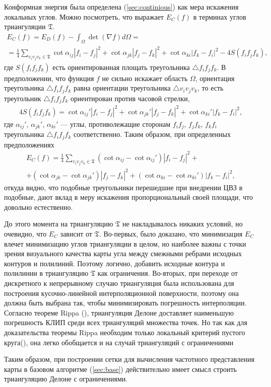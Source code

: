 Конформная энергия была определена (\ref{sec:continious}) как мера искажения локальных углов.
Можно посмотреть, что выражает $E_C(f)$ в терминах углов триангуляции $\mathfrak{T}$. 
\begin{multline*}
  E_C(f) = E_D(f) - \int_{\Omega} \det (\nabla f) d\Omega = \\ 
  = \frac{1}{4} \sum_{v_i v_j v_k \in \mathfrak{T}} \cot{\alpha_{ij}}|f_i - f_j|^2 + 
  \cot{\alpha_{jk}}|f_j - f_k|^2 + \cot{\alpha_{ki}}|f_k - f_i|^2 - 4S(f_i f_j f_k),
\end{multline*}
где $S(f_i f_j f_k)$ есть ориентированная площать треугольника $\triangle f_i f_j f_k$. 
В предположении, что функция $f$ не сильно искажает область $\Omega$, 
ориентация треугольника $\triangle f_i f_j f_k$ равна ориентации треугольника 
$\triangle v_i v_j v_k$, то есть треугольник $\triangle f_i f_j f_k$ ориентирован против часовой
стрелки,
\begin{multline*}
  4 S(f_i f_j f_k) = \cot{\alpha_{ij}'}|f_i - f_j|^2 + \cot{\alpha_{jk}'}|f_j - f_k|^2 + \cot{\alpha_{ki}'}|f_k - f_i|^2,
\end{multline*}
где $\alpha_{ij}'$, $\alpha_{jk}'$, $\alpha_{ki}'$ --- углы, противолежащие сторонам $f_i f_j$, 
$f_j f_k$, $f_k f_i$ треугольника $\triangle f_i f_j f_k$ соответственно. 
Таким образом, при определенных предположениях
\begin{multline*}
  E_C(f) = \frac{1}{4} \sum_{v_i v_j v_k \in \mathfrak{T}} (\cot{\alpha_{ij}} - \cot{\alpha_{ij}'})|f_i - f_j|^2 + \\
  + (\cot{\alpha_{jk}} - \cot{\alpha_{jk}'})|f_j - f_k|^2 + (\cot{\alpha_{ki}} - \cot{\alpha_{ki}'})|f_k - f_i|^2,
\end{multline*} откуда видно, что подобные треугольники перешедшие при внедрении ЦВЗ в подобные,
дают вклад в меру искажения пропорциональный своей площади, что довольно естественно.

До этого момента на триангуляцию $\mathfrak{T}$ не накладывалось никаких условий, но очевидно, что
$E_C$ зависит от $\mathfrak{T}$. Во-первых, было доказано, что минимизация $E_C$ влечет 
минимизацию углов триангуляции в целом, но наиболее важны с точки зрения визуального качества
карты угла между смежными ребрами исходных контуров и полилиний. Поэтому логично, 
добавить исходные контура и полилинии в триангуляцию $\mathfrak{T}$ как ограничения.
Во-вторых, при переходе от дискретного к непрерывному случаю триангуляция была использована для
построения кусочно-линейной интерполяционной поверхности, поэтому она должна быть выбрана так,
чтобы минимизировать погрешность интерполяции. Согласно теореме Rippa (\cite{Rippa}), 
триангуляция Делоне доставляет наименьшую погрешность КЛИП среди всех триангуляций 
множества точек.
Но так как для доказательства теоремы Rippa необходим только локальный критерий 
пустого круга(\cite{Chen}), она легко обобщается и на случай триангуляций с ограничениями

Таким образом, при построении сетки для вычисления частотного представления карты в 
базовом алгоритме (\ref{sec:base}) действительно имеет смысл строить триангуляцию Делоне 
с ограничениями. 
